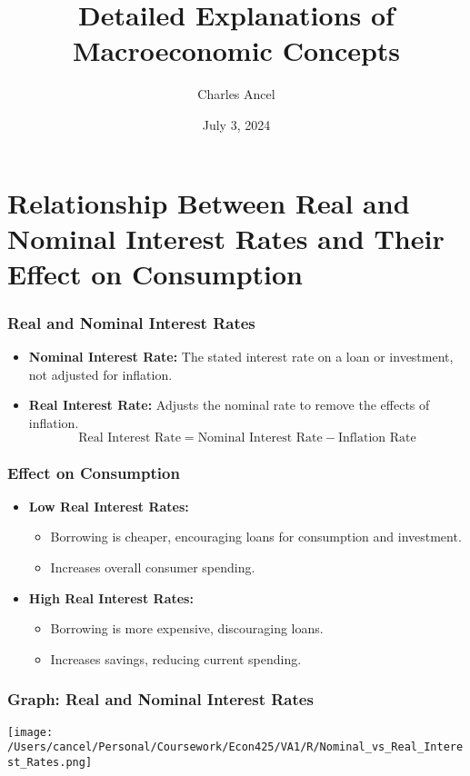 \documentclass{beamer}
\title{Detailed Explanations of Macroeconomic Concepts}
\author{Charles Ancel}
\date{July 3, 2024}
\begin{document}
\frame{\titlepage}

\section{Relationship Between Real and Nominal Interest Rates and Their Effect on Consumption}
\begin{frame}
    \frametitle{Real and Nominal Interest Rates}
    \begin{itemize}
        \item \textbf{Nominal Interest Rate:} The stated interest rate on a loan or investment, not adjusted for inflation.
        \item \textbf{Real Interest Rate:} Adjusts the nominal rate to remove the effects of inflation.
        \begin{equation*}
            \text{Real Interest Rate} = \text{Nominal Interest Rate} - \text{Inflation Rate}
        \end{equation*}
    \end{itemize}
\end{frame}

\begin{frame}
    \frametitle{Effect on Consumption}
    \begin{itemize}
        \item \textbf{Low Real Interest Rates:}
        \begin{itemize}
            \item Borrowing is cheaper, encouraging loans for consumption and investment.
            \item Increases overall consumer spending.
        \end{itemize}
        \item \textbf{High Real Interest Rates:}
        \begin{itemize}
            \item Borrowing is more expensive, discouraging loans.
            \item Increases savings, reducing current spending.
        \end{itemize}
    \end{itemize}
\end{frame}

\begin{frame}
    \frametitle{Graph: Real and Nominal Interest Rates}
    \begin{center}
        \texttt{[image: /Users/cancel/Personal/Coursework/Econ425/VA1/R/Nominal\_vs\_Real\_Interest\_Rates.png]}
    \end{center}
\end{frame}
\end{document}
